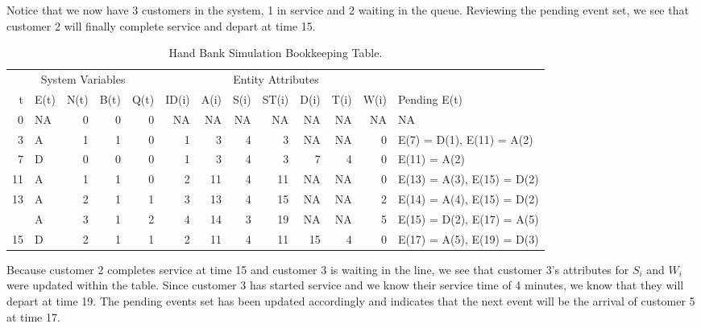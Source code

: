 \documentclass[
]{book}
\theoremstyle{definition}
\theoremstyle{definition}
\theoremstyle{definition}
\theoremstyle{definition}
\theoremstyle{remark}
\begin{document}
Notice that we now have 3 customers in the system, 1 in service and 2
waiting in the queue. Reviewing the pending event set, we see that
customer 2 will finally complete service and depart at time 15.

\begin{table}

\caption{\label{tab:SQBH7}Hand Bank Simulation Bookkeeping Table.}
\centering
\fontsize{10}{12}\selectfont
\begin{tabular}[t]{rlrrrrrrrrrrl}
\toprule
\multicolumn{5}{c}{System Variables} & \multicolumn{7}{c}{Entity Attributes} & \multicolumn{1}{c}{ } \\
\cmidrule(l{3pt}r{3pt}){1-5} \cmidrule(l{3pt}r{3pt}){6-12}
t & E(t) & N(t) & B(t) & Q(t) & ID(i) & A(i) & S(i) & ST(i) & D(i) & T(i) & W(i) & Pending E(t)\\
\midrule
0 & NA & 0 & 0 & 0 & NA & NA & NA & NA & NA & NA & NA & NA\\
3 & A & 1 & 1 & 0 & 1 & 3 & 4 & 3 & NA & NA & 0 & E(7) = D(1), E(11) = A(2)\\
7 & D & 0 & 0 & 0 & 1 & 3 & 4 & 3 & 7 & 4 & 0 & E(11) = A(2)\\
11 & A & 1 & 1 & 0 & 2 & 11 & 4 & 11 & NA & NA & 0 & E(13) = A(3), E(15) = D(2)\\
13 & A & 2 & 1 & 1 & 3 & 13 & 4 & 15 & NA & NA & 2 & E(14) = A(4), E(15) = D(2)\\
\addlinespace
14 & A & 3 & 1 & 2 & 4 & 14 & 3 & 19 & NA & NA & 5 & E(15) = D(2), E(17) = A(5)\\
15 & D & 2 & 1 & 1 & 2 & 11 & 4 & 11 & 15 & 4 & 0 & E(17) = A(5), E(19) = D(3)\\
\bottomrule
\end{tabular}
\end{table}

Because customer 2 completes service at time 15 and customer 3 is
waiting in the line, we see that customer 3's attributes for \(S_{i}\) and
\(W_{i}\) were updated within the table. Since customer 3 has started
service and we know their service time of 4 minutes, we know that they
will depart at time 19. The pending events set has been updated
accordingly and indicates that the next event will be the arrival of
customer 5 at time 17.
\end{document}
